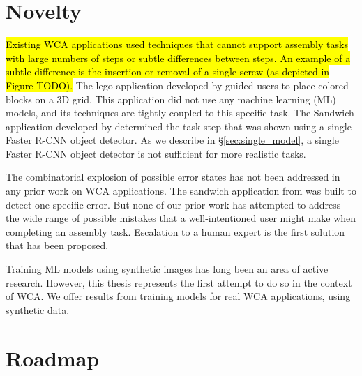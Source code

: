 \section{Novelty}

\hl{
  Existing WCA applications used techniques that cannot support assembly tasks
  with large numbers of steps or subtle differences between steps.
  An example of a subtle difference is the insertion or removal of a single
  screw (as depicted in Figure TODO).
}
The lego application developed by \citet{chen2017} guided users to place colored
blocks on a 3D grid.
This application did not use any machine learning (ML) models, and its
techniques are tightly coupled to this specific task.
The Sandwich application developed by \citet{chen2017} determined the task step
that was shown using a single Faster R-CNN object detector.
As we describe in \S\ref{sec:single_model}, a single Faster R-CNN object
detector is not sufficient for more realistic tasks.

The combinatorial explosion of possible error states has not been addressed in
any prior work on WCA applications.
The sandwich application from \citet{chen2017} was built to detect one specific
error.
But none of our prior work has attempted to address the wide range of possible
mistakes that a well-intentioned user might make when completing an assembly
task.
Escalation to a human expert is the first solution that has been proposed.

Training ML models using synthetic images has long been an area of active
research.
However, this thesis represents the first attempt to do so in the context of
WCA.
We offer results from training models for real WCA applications, using synthetic
data.

\section{Roadmap}

